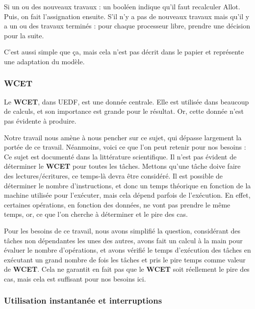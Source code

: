 		Si un ou des nouveaux travaux : un booléen indique qu'il faut recalculer Allot. Puis, 
		on fait l'assignation ensuite.
		S'il n'y a pas de nouveaux travaux mais qu'il y a un ou des travaux terminés :
		pour chaque processeur libre, prendre une décision pour la suite.\newline
		
		C'est aussi simple que ça, mais cela n'est pas décrit dans le papier et représente une 
		adaptation du modèle.
	
	
		
	\subsubsection{WCET}
		Le \textbf{WCET}, dans UEDF, est une donnée centrale. Elle est utilisée dans beaucoup de calculs, et 
		son importance est grande pour le résultat. Or, cette donnée n'est pas évidente à produire. \newline
		
		Notre travail nous amène à nous pencher sur ce sujet, qui dépasse largement la portée de ce travail. 
		Néanmoins, voici ce que l'on peut retenir pour nos besoins :\\
		Ce sujet est documenté dans la littérature scientifique. Il n'est pas évident de déterminer le 
		\textbf{WCET} pour toutes les tâches. Mettons qu'une tâche doive faire des lectures/écritures, 
		ce temps-là devra être considéré. Il est possible de déterminer le nombre d'instructions, 
		et donc un temps théorique en fonction de la machine utilisée pour l'exécuter, mais cela dépend 
		parfois de l'exécution. En effet, certaines opérations, en fonction des données, ne vont pas prendre 
		le même temps, or, ce que l'on cherche à déterminer et le pire des cas.\newline
	
		Pour les besoins de ce travail, nous avons simplifié la question, considérant des tâches 
		non dépendantes les unes des autres, avons fait un calcul à la main pour évaluer le 
		nombre d'opérations, et avons vérifié le temps d'exécution des tâches en exécutant un grand nombre 
		de fois les tâches et pris le pire temps comme valeur de \textbf{WCET}. Cela ne garantit en fait 
		pas que le \textbf{WCET} soit réellement le pire des cas, mais cela est suffisant pour nos besoins ici.
	
	\newpage
	\subsubsection{Utilisation instantanée et interruptions}

